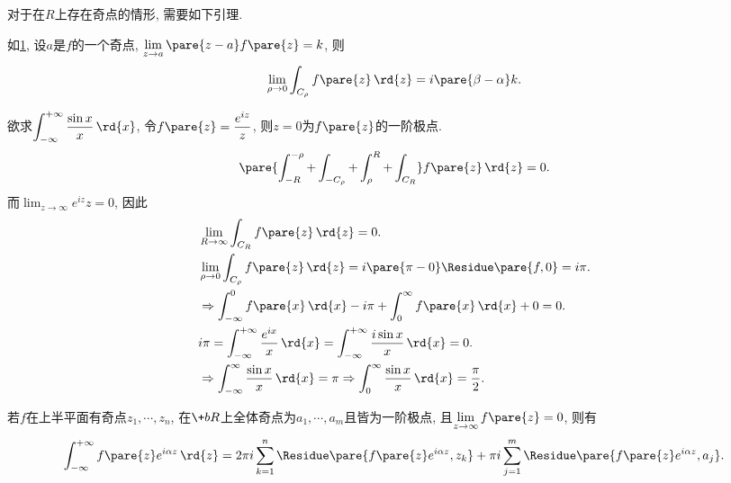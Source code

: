 \documentclass{ctexart}
\begin{document}
\begin{figure}[ht]
    \centering
    \caption{}
    \label{fig:环绕奇点的弧的积分}
\end{figure}
对于在$R$上存在奇点的情形, 需要如下引理.
\begin{lemma}
    如\cref{fig:环绕奇点的弧的积分}, 设$a$是$f$的一个奇点, $\displaystyle \lim_{z\rightarrow a}\pare{z-a}f\pare{z} = k$, 则
    \[ \lim_{\rho\rightarrow 0} \int_{C_\rho} f\pare{z}\,\rd{z} = i\pare{\beta - \alpha} k. \]
\end{lemma}
\begin{sample}
    \begin{ex}
        欲求$\displaystyle \int_{-\infty}^{+\infty} \frac{\sin x}{x}\,\rd{x}$, 令$f\pare{z} = \displaystyle \frac{e^{iz}}{z}$, 则$z = 0$为$f\pare{z}$的一阶极点.
        \[ \pare{\int_{-R}^{-\rho} + \int_{-C_\rho} + \int_\rho^R + \int_{C_R}}f\pare{z}\,\rd{z} = 0. \]
        而$\displaystyle \lim_{z\rightarrow \infty}{e^{iz}}{z} = 0$, 因此
        \begin{align*}
            &\lim_{R\rightarrow\infty} \int_{C_R}f\pare{z}\,\rd{z} = 0. \\
            &\lim_{\rho\rightarrow 0} \int_{C_\rho} f\pare{z}\,\rd{z} = i\pare{\pi - 0}\Residue\pare{f,0} = i\pi. \\
            &\Rightarrow \int_{-\infty}^0 f\pare{x}\,\rd{x} - i\pi + \int_0^\infty f\pare{x}\,\rd{x} + 0 = 0. \\
            &i\pi = \int_{-\infty}^{+\infty} \frac{e^{ix}}{x}\,\rd{x} = \int_{-\infty}^{+\infty} \frac{i\sin x}{x}\,\rd{x} = 0. \\
            &\Rightarrow \int_{-\infty}^{\infty} \frac{\sin x}{x}\,\rd{x} = \pi \Rightarrow \int_0^\infty \frac{\sin x}{x}\,\rd{x} = \frac{\pi}{2}.
        \end{align*}
    \end{ex}
\end{sample}
\begin{proposition}
    若$f$在上半平面有奇点$z_1,\cdots,z_n$, 在$\+bR$上全体奇点为$a_1,\cdots,a_m$且皆为一阶极点, 且$\displaystyle \lim_{z\rightarrow\infty} f\pare{z}= 0$, 则有
    \[ \int_{-\infty}^{+\infty} f\pare{z}e^{i\alpha z}\,\rd{z} = 2\pi i\sum_{k=1}^n \Residue\pare{f\pare{z}e^{i\alpha z},z_k} + \pi i \sum_{j=1}^m \Residue\pare{f\pare{z}e^{i\alpha z}, a_j}. \]
\end{proposition}
\end{document}
